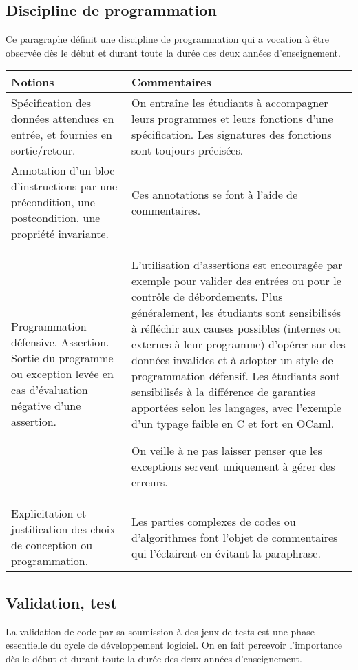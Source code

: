\subsection{Discipline de programmation \semUn \semDeux \semTroisQuatre}
Ce paragraphe définit une discipline de programmation qui a vocation à être observée dès le début et durant toute la durée des deux années d'enseignement.

\begin{longtable}{|p{\lnotion}|p{\comment}|}
    \hline
    \textbf{Notions} & \textbf{Commentaires} \\
    \hline \hline
    Spécification des données attendues en entrée, et fournies en sortie/retour.
    &
    On entraîne les étudiants à accompagner leurs programmes et
      leurs fonctions d'une spécification. Les signatures des fonctions sont toujours précisées.
    \\
    \hline
    Annotation d'un bloc d'instructions par une précondition, une postcondition, une propriété invariante.
    & Ces annotations se font à l'aide de commentaires.
    \\
    \hline
    Programmation défensive. Assertion. Sortie du programme ou exception levée en cas d'évaluation négative d'une assertion.
    &
    L'utilisation d'assertions est encouragée par exemple pour valider des entrées ou pour le contrôle de débordements. Plus généralement, les étudiants sont sensibilisés à réfléchir aux causes possibles (internes ou externes à leur programme) d'opérer sur des données invalides et à adopter un style de programmation défensif. Les étudiants sont sensibilisés à la différence de garanties apportées selon les langages, avec l'exemple d'un typage faible en C et fort en OCaml.
    
    On veille à ne pas laisser penser que les exceptions servent uniquement à gérer des erreurs.
    \\
    \hline
    Explicitation et justification des choix de conception ou programmation.
        &
        Les parties complexes de codes ou d'algorithmes font l'objet de commentaires qui l'éclairent en évitant la paraphrase.
    \\
    \hline
\end{longtable}

\subsection{Validation, test \semUn}

La validation de code par sa soumission à des jeux de tests est une phase essentielle du cycle de développement logiciel. On en fait percevoir l'importance dès le début et durant toute la durée des deux années d'enseignement.

